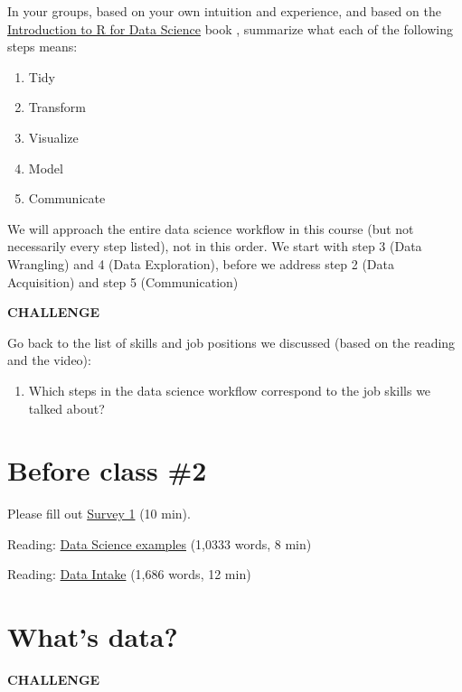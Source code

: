 \documentclass[
]{book}
\providecommand{\tightlist}{%
  \setlength{\itemsep}{0pt}\setlength{\parskip}{0pt}}
\begin{document}
In your groups, based on your own intuition and experience, and based on the \href{https://r4ds.had.co.nz/introduction.html}{Introduction to R for Data Science} book \citep{grolemund2018r}, summarize what each of the following steps means:

\begin{enumerate}
\def\labelenumi{\arabic{enumi})}
\item
  Tidy
\item
  Transform
\item
  Visualize
\item
  Model
\item
  Communicate
\end{enumerate}

We will approach the entire data science workflow in this course (but not necessarily every step listed), not in this order. We start with step 3 (Data Wrangling) and 4 (Data Exploration), before we address step 2 (Data Acquisition) and step 5 (Communication)

\textbf{CHALLENGE}

Go back to the list of skills and job positions we discussed (based on the reading and the video):

\begin{enumerate}
\def\labelenumi{\arabic{enumi})}
\tightlist
\item
  Which steps in the data science workflow correspond to the job skills we talked about?
\end{enumerate}

\hypertarget{before-class-2}{%
\section{Before class \#2}\label{before-class-2}}

Please fill out \href{https://forms.gle/M8bndLeUQLSJFrH99}{Survey 1} (10 min).

Reading: \href{readings/module2_eds_leek_whatsdatascience.pdf}{Data Science examples} (1,0333 words, 8 min)

Reading: \href{readings/module2_modern_data_science_data_intake.pdf}{Data Intake} (1,686 words, 12 min)

\hypertarget{whats-data}{%
\section{What's data?}\label{whats-data}}

\textbf{CHALLENGE}
\end{document}
